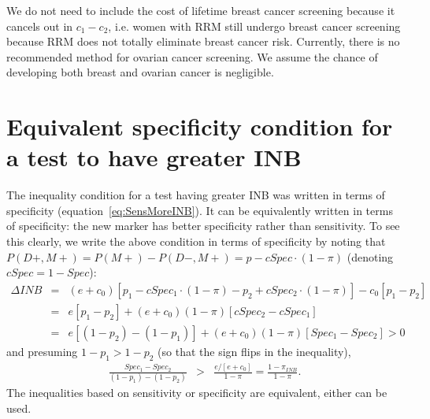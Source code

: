 \documentclass[11pt, letterpaper]{article}
\begin{document}
We do not need to include the cost of lifetime breast cancer screening because it cancels out in $c_1-c_2$, i.e. women with RRM still undergo breast cancer screening because RRM does not totally eliminate breast cancer risk.  Currently, there is no recommended method for ovarian cancer screening.  We assume the chance of developing both breast and ovarian cancer is negligible.


\section{Equivalent specificity condition for a test to have greater INB}
\label{sec:SpecMoreINB}

The inequality condition for a test having greater INB was written in terms of specificity (equation~\ref{eq:SensMoreINB}).  It  can be equivalently written in terms of specificity: the new marker has better specificity rather than sensitivity.  To see this clearly, we write the above condition in terms of specificity by noting that $P(D+,M+)=P(M+)-P(D-,M+)=p-cSpec\cdot(1-\pi)$ (denoting $cSpec=1-Spec$):
\begin{eqnarray*}
	\Delta INB &=& (e+c_0)[p_1-cSpec_1\cdot(1-\pi) - p_2+cSpec_2\cdot(1-\pi)] - c_0[p_1-p_2]\\
	&=& e[p_1-p_2] +  (e+c_0)(1-\pi)[cSpec_2-cSpec_1]\\
	&=& e[(1-p_2)-(1-p_1)] + (e+c_0)(1-\pi)[Spec_1-Spec_2] >0
\end{eqnarray*}
and presuming $1-p_1>1-p_2$ (so that the sign flips in the inequality),
\begin{eqnarray*}
	\frac{Spec_1-Spec_2}{(1-p_1)-(1-p_2)} &>& \frac{e/[e+c_0]}{1-\pi} = \frac{1-\pi_{INB}}{1-\pi}.
\end{eqnarray*}
The inequalities based on sensitivity or specificity are equivalent, either can be used.  
\end{document}
